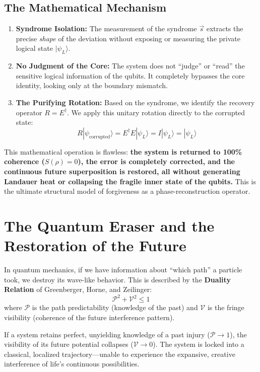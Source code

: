 \documentclass[11pt,twocolumn]{article}
\begin{document}
\subsection{The Mathematical Mechanism}
\begin{enumerate}
    \item \textbf{Syndrome Isolation:} The measurement of the syndrome $\vec{s}$ extracts the precise \textit{shape} of the deviation without exposing or measuring the private logical state $|\psi_L\rangle$.
    \item \textbf{No Judgment of the Core:} The system does not ``judge'' or ``read'' the sensitive logical information of the qubits. It completely bypasses the core identity, looking only at the boundary mismatch.
    \item \textbf{The Purifying Rotation:} Based on the syndrome, we identify the recovery operator $R = E^\dagger$. We apply this unitary rotation directly to the corrupted state:
    \begin{equation}
    R |\psi_{\text{corrupted}}\rangle = E^\dagger E |\psi_L\rangle = I |\psi_L\rangle = |\psi_L\rangle
    \end{equation}
\end{enumerate}

This mathematical operation is flawless: \textbf{the system is returned to 100\% coherence ($S(\rho) = 0$), the error is completely corrected, and the continuous future superposition is restored, all without generating Landauer heat or collapsing the fragile inner state of the qubits.} This is the ultimate structural model of forgiveness as a phase-reconstruction operator.

\section{The Quantum Eraser and the \\ Restoration of the Future}

In quantum mechanics, if we have information about ``which path'' a particle took, we destroy its wave-like behavior. This is described by the \textbf{Duality Relation} of Greenberger, Horne, and Zeilinger:
\begin{equation}
\mathcal{P}^2 + \mathcal{V}^2 \leq 1
\end{equation}
where $\mathcal{P}$ is the path predictability (knowledge of the past) and $\mathcal{V}$ is the fringe visibility (coherence of the future interference pattern).

If a system retains perfect, unyielding knowledge of a past injury ($\mathcal{P} \to 1$), the visibility of its future potential collapses ($\mathcal{V} \to 0$). The system is locked into a classical, localized trajectory---unable to experience the expansive, creative interference of life's continuous possibilities.
\end{document}
